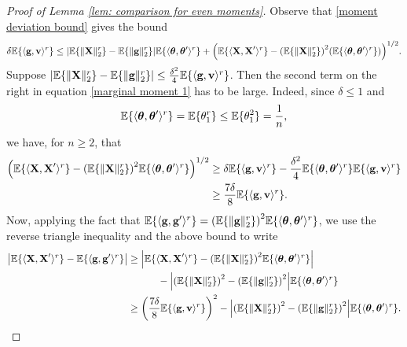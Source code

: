 \documentclass[final,12pt]{colt2018} %
\numberwithin{equation}{section}
\DeclarePairedDelimiter{\abs}{\lvert}{\rvert}
\DeclarePairedDelimiter{\norm}{\lVert}{\rVert}
\DeclarePairedDelimiter{\paren}{(}{)}
\DeclarePairedDelimiter{\braces}{\lbrace}{\rbrace}
\DeclarePairedDelimiter{\inprod}{\langle}{\rangle}
\newcommand{\E}{\mathbb{E}}
\newcommand{\boldg}{\textbf{g}}
\newcommand{\boldv}{\textbf{v}}
\newcommand{\boldtheta}{\boldsymbol{\theta}}
\newcommand{\boldX}{\textbf{X}}
\begin{document}
\begin{proof}[Proof of Lemma \ref{lem: comparison for even moments}]
	Observe that \eqref{moment deviation bound} gives the bound
	\begin{align} \label{marginal moment 1}
	\delta\E\braces{ \inprod{\boldg,\boldv}^r} \leq \abs*{\E\braces{\norm{\boldX}_2^r}-\E\braces{\norm{\boldg}_2^r}}\E\braces{\inprod{\boldtheta,\boldtheta'}^r}+\paren*{\E\braces{\inprod{\boldX,\boldX'}^r} - \paren*{\E\braces{\norm{\boldX}^r_2}}^2\paren*{\E\braces{\inprod{\boldtheta,\boldtheta'}^r}}}^{1/2}.
	\end{align}
	Suppose $\abs*{\E\braces{\norm{\boldX}_2^r}-\E\braces{\norm{\boldg}_2^r}} \leq \frac{\delta^2}{4}\E\braces{ \inprod{\boldg,\boldv}^r}$. Then the second term on the right in equation \eqref{marginal moment 1} has to be large. Indeed, since $\delta \leq 1$ and
	\[
	\E\braces{\inprod{\boldtheta,\boldtheta'}^r} = \E\braces{\theta_1^r} \leq \E\braces{\theta_1^2} = \frac{1}{n},
	\]
	we have, for $n \geq 2$, that
	\begin{align*}
	\paren*{\E\braces{\inprod{\boldX,\boldX'}^r} - \paren*{\E\braces{\norm{\boldX}^r_2}}^2\E\braces{\inprod{\boldtheta,\boldtheta'}^r}}^{1/2} & \geq \delta \E\braces{ \inprod{\boldg,\boldv}^r} - \frac{\delta^2}{4}\E\braces{\inprod{\boldtheta,\boldtheta'}^r}\E\braces{ \inprod{\boldg,\boldv}^r} \\
	& \geq \frac{7\delta}{8} \E\braces{ \inprod{\boldg,\boldv}^r}.
	\end{align*}	
	Now, applying the fact that $\E\braces{ \inprod{\boldg,\boldg'}^r} = \paren*{\E\braces{\norm{\boldg}_2^r}}^2\E\braces{ \inprod{\boldtheta,\boldtheta'}^r}$, we use the reverse triangle inequality and the above bound to write
	\begin{align} \label{marginal moment 2}
	\abs*{\E\braces{\inprod{\boldX,\boldX'}^r} - \E\braces{\inprod{\boldg,\boldg'}^r}} & \geq \abs*{\E\braces{\inprod{\boldX,\boldX'}^r} - \paren*{\E\braces{\norm{\boldX}^r_2}}^2\E\braces{\inprod{\boldtheta,\boldtheta'}^r}} \\ & \quad\quad\quad - \abs*{\paren*{\E\braces{\norm{\boldX}_2^r}}^2-\paren*{\E\braces{\norm{\boldg}_2^r}}^2}\E\braces{\inprod{\boldtheta,\boldtheta'}^r} \nonumber \\
	& \geq \paren*{\frac{7\delta}{8} \E\braces{ \inprod{\boldg,\boldv}^r}}^2 - \abs*{\paren*{\E\braces{\norm{\boldX}_2^r}}^2-\paren*{\E\braces{\norm{\boldg}_2^r}}^2}\E\braces{\inprod{\boldtheta,\boldtheta'}^r}.
	\end{align}
	

\end{proof}
\end{document}
